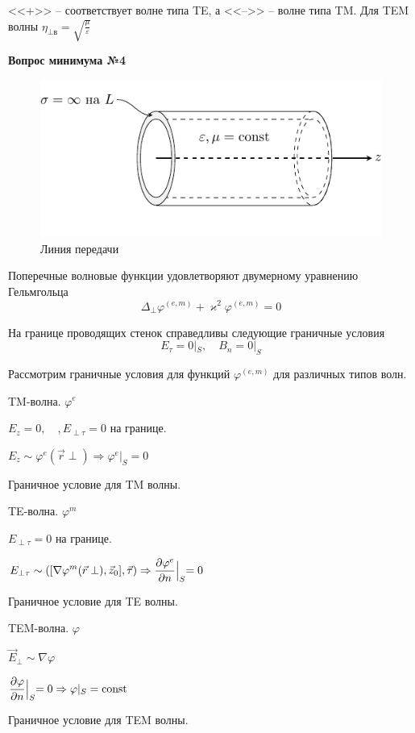 \documentclass[a4paper,14pt]{extarticle}
\DeclareMathOperator{\const}{const}
\renewcommand{\phi}{\varphi}
\renewcommand{\epsilon}{\varepsilon}
\renewcommand{\kappa}{\varkappa}
\newcommand{\ticket}[1] {
\newpage
\hypertarget{num#1}{}
\begin{center}
	\textbf{Вопрос минимума №#1 }
\end{center}
}
\begin{document}
	<<+>> -- соответствует волне типа TE, а <<-->> -- волне типа TM. Для TEM волны $\displaystyle \eta_{\perp\text{в}}=\sqrt{\frac{\mu}{\epsilon}}$
	
\ticket{4}
	\begin{figure}[h!]
		\centering
		\includegraphics[scale=1.5]{img/lect2_ris1}
		\caption{Линия передачи}
		\label{fig:wavegain:1}
	\end{figure}
	Поперечные волновые функции удовлетворяют двумерному уравнению Гельмгольца
	$$\Delta_\perp\phi^{(e,m)}+\kappa^2\phi^{(e,m)}=0$$
	
	На границе проводящих стенок справедливы следующие граничные условия
	$$E_\tau = 0 |_S, \quad B_n = 0 |_S$$
	
	Рассмотрим граничные условия для функций $\phi^{(e,m)}$ для различных типов волн.
	
	TM-волна. $\phi^e$
	
	$E_z=0, \quad, E_{\perp\tau}=0$ на границе.
	
	$E_z\sim \phi^e(\vec{r}\perp) \Rightarrow \phi^e|_S = 0$
	
	Граничное условие для TM волны.
	\vspace{20pt}
	
	TE-волна. $\phi^m$
	
	$E_{\perp\tau}=0$ на границе.
	
	$\displaystyle E_{\perp\tau}\sim ([\nabla\phi^m(\vec{r}\perp),\vec{z}_0],\vec{\tau}) \Rightarrow \pdv{\phi^e}{n}\Bigl|_S = 0$

	Граничное условие для TE волны.
	\vspace{20pt}
	
	TEM-волна. $\phi$
	
	$\vec{E}_{\perp}\sim \nabla\phi$
	
	$\displaystyle \pdv{\phi}{n}\Bigl|_S = 0 \Rightarrow \phi|_S=\const$
	
	Граничное условие для TEM волны.
	
\end{document}
